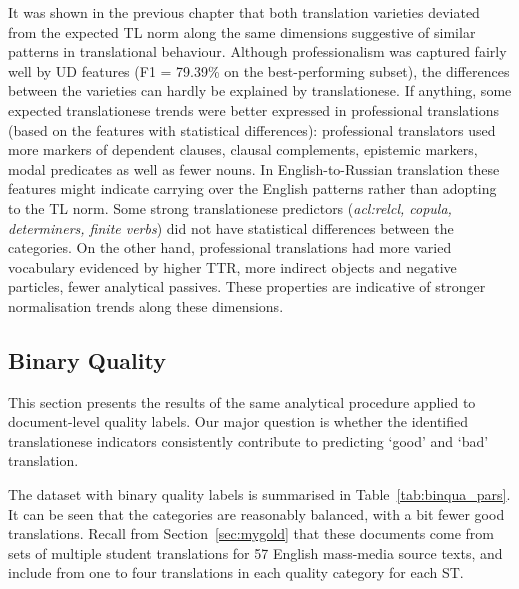 It was shown in the previous chapter that both translation varieties deviated from the expected TL norm along the same dimensions suggestive of similar patterns in translational behaviour. 
Although professionalism was captured fairly well by UD features (F1 = 79.39\% on the best-performing subset), the differences between the varieties can hardly be explained by translationese.
\label{pg:more_professional_more_translated} If anything, some expected translationese trends were better expressed in professional translations (based on the features with statistical differences): professional translators used more markers of dependent clauses, clausal complements, epistemic markers, modal predicates as well as fewer nouns. %
In English-to-Russian translation these features might indicate carrying over the English patterns rather than adopting to the TL norm. %
Some strong translationese predictors (\textit{acl:relcl, copula, determiners, finite verbs}) did not have statistical differences between the categories.
On the other hand, professional translations had more varied vocabulary evidenced by higher TTR, more indirect objects and negative particles, fewer analytical passives. These properties are indicative of stronger normalisation trends along these dimensions.

\subsection{\label{ssec:bin}Binary Quality}
This section presents the results of the same analytical procedure applied to document-level quality labels. 
Our major question is whether the identified translationese indicators consistently contribute to predicting `good' and `bad' translation. 

The dataset with binary quality labels is summarised in Table~\ref{tab:binqua_pars}. It can be seen that the categories are reasonably balanced, with a bit fewer good translations. Recall from Section~\ref{sec:mygold} that these documents come from sets of multiple student translations for 57 English mass-media source texts, and include from one to four translations in each quality category for each ST.

